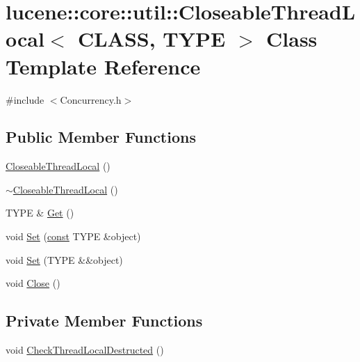 \hypertarget{classlucene_1_1core_1_1util_1_1CloseableThreadLocal}{}\section{lucene\+:\+:core\+:\+:util\+:\+:Closeable\+Thread\+Local$<$ C\+L\+A\+SS, T\+Y\+PE $>$ Class Template Reference}
\label{classlucene_1_1core_1_1util_1_1CloseableThreadLocal}


{\ttfamily \#include $<$Concurrency.\+h$>$}

\subsection*{Public Member Functions}
\begin{DoxyCompactItemize}
\item 
\mbox{\hyperlink{classlucene_1_1core_1_1util_1_1CloseableThreadLocal_a9f142d18bd6ce2cedd4e546c1f0a4f48}{Closeable\+Thread\+Local}} ()
\item 
\mbox{\hyperlink{classlucene_1_1core_1_1util_1_1CloseableThreadLocal_a351cc693f801a08cdfc1460c08b46dca}{$\sim$\+Closeable\+Thread\+Local}} ()
\item 
T\+Y\+PE \& \mbox{\hyperlink{classlucene_1_1core_1_1util_1_1CloseableThreadLocal_a3d4ba44072bfd8fb6e87ccc214349ace}{Get}} ()
\item 
void \mbox{\hyperlink{classlucene_1_1core_1_1util_1_1CloseableThreadLocal_af6068e7d6c7de9e5f0a9e23811227e8f}{Set}} (\mbox{\hyperlink{ZlibCrc32_8h_a2c212835823e3c54a8ab6d95c652660e}{const}} T\+Y\+PE \&object)
\item 
void \mbox{\hyperlink{classlucene_1_1core_1_1util_1_1CloseableThreadLocal_a7d6993982d3b1daeae39d75feb926b34}{Set}} (T\+Y\+PE \&\&object)
\item 
void \mbox{\hyperlink{classlucene_1_1core_1_1util_1_1CloseableThreadLocal_a3f2edc7d9c2a0ce9cf16632527553ee4}{Close}} ()
\end{DoxyCompactItemize}
\subsection*{Private Member Functions}
\begin{DoxyCompactItemize}
\item 
void \mbox{\hyperlink{classlucene_1_1core_1_1util_1_1CloseableThreadLocal_a489ab727ebcf95af41ec59265b5804d8}{Check\+Thread\+Local\+Destructed}} ()
\end{DoxyCompactItemize}

